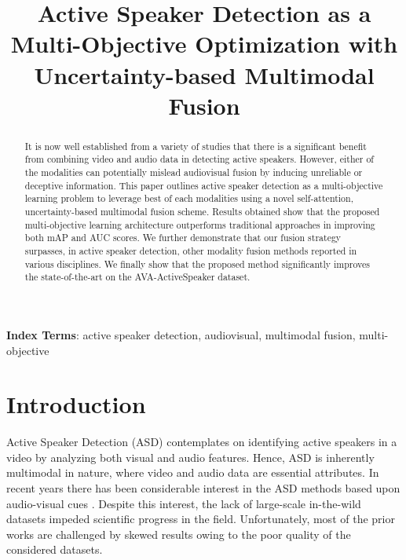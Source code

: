 \documentclass[a4paper]{article}
\title{Active Speaker Detection as a Multi-Objective Optimization with Uncertainty-based Multimodal Fusion}
\begin{document}
\maketitle
\begin{abstract}
It is now well established from a variety of studies that there is a significant benefit from combining video and audio data in detecting active speakers. However, either of the modalities can potentially mislead audiovisual fusion by inducing unreliable or deceptive information. This paper outlines active speaker detection as a multi-objective learning problem to leverage best of each modalities using a novel self-attention, uncertainty-based multimodal fusion scheme. Results obtained show that the proposed multi-objective learning architecture outperforms traditional approaches in improving both mAP and AUC scores. We further demonstrate that our fusion strategy surpasses, in active speaker detection, other modality fusion methods reported in various disciplines. We finally show that the proposed method significantly improves the state-of-the-art on the AVA-ActiveSpeaker dataset.
\end{abstract}
\noindent\textbf{Index Terms}: active speaker detection, audiovisual, multimodal fusion, multi-objective

\section{Introduction}

Active Speaker Detection (ASD) contemplates on identifying active speakers in a video by analyzing both visual and audio features. Hence, ASD is inherently multimodal in nature, where video and audio data are essential attributes. In recent years there has been considerable interest in the ASD methods based upon audio-visual cues \cite{871073, whos_speaking?_Chakravarty1, Chakravarty2, audio_visualcotraining_Chakravarty3, syncnet}. Despite this interest, the lack of large-scale in-the-wild datasets impeded scientific progress in the field. Unfortunately, most of the prior works are challenged by skewed results owing to the poor quality of the considered datasets.
\end{document}

